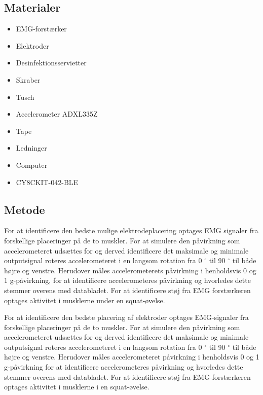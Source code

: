 \subsection{Materialer} 
\begin{itemize}
\item EMG-forstærker
\item Elektroder
\item Desinfektionsservietter
\item Skraber
\item Tusch 

\item Accelerometer ADXL335Z
\item Tape
\item Ledninger

\item Computer
\item CY8CKIT-042-BLE
\end{itemize}

\subsection{Metode}

For at identificere den bedste mulige elektrodeplacering optages EMG signaler fra forskellige placeringer på de to muskler. 
For at simulere den påvirkning som accelerometeret udsættes for og derved identificere det maksimale og minimale outputsignal roteres accelerometeret i en langsom rotation fra 0 $^{\circ}$ til 90 $^{\circ}$ til både højre og venstre. Herudover måles accelerometerets påvirkning i henholdsvis 0 og 1 g-påvirkning, for at identificere accelerometeres påvirkning og hvorledes dette stemmer overens med databladet. 
For at identificere støj fra EMG forstærkeren optages aktivitet i musklerne under en squat-øvelse.
 
For at identificere den bedste placering af elektroder optages EMG-signaler fra forskellige placeringer på de to muskler. 
For at simulere den påvirkning som accelerometeret udsættes for og derved identificere det maksimale og minimale outputsignal roteres accelerometeret i en langsom rotation fra 0 $^{\circ}$ til 90 $^{\circ}$  til både højre og venstre. Herudover måles accelerometeret påvirkning i henholdsvis 0 og 1 g-påvirkning for at identificere accelerometeres påvirkning og hvorledes dette stemmer overens med databladet. 
For at identificere støj fra EMG-forstærkeren optages aktivitet i musklerne i en squat-øvelse.


